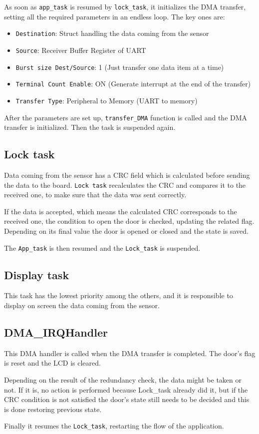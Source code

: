 As soon as \texttt{app\_task} is resumed by \texttt{lock\_task}, it initializes the DMA transfer, setting all the required parameters in an endless loop. The key ones are:
\begin{itemize}
    \item \texttt{Destination}: Struct handling the data coming from the sensor
    \item \texttt{Source}: Receiver Buffer Register of UART
    \item \texttt{Burst size Dest/Source}: 1 (Just transfer one data item at a time)
    \item \texttt{Terminal Count Enable}: ON (Generate interrupt at the end of the transfer)
    \item \texttt{Transfer Type}: Peripheral to Memory (UART to memory)
\end{itemize}
After the parameters are set up,  \texttt{transfer\_DMA} function is called and the DMA transfer is initialized. Then the task is suspended again. 


\subsection{Lock task}
Data coming from the sensor has a CRC field which is calculated before sending the data to the board. \texttt{Lock task} recalculates the CRC and compares it to the received one, to make sure that the data was sent correctly. 

If the data is accepted, which means the calculated CRC corresponds to the received one, the condition to open the door is checked, updating the related flag. Depending on its final value the door is opened or closed and the state is saved. 

The \texttt{App\_task} is then resumed and the \texttt{Lock\_task} is suspended. 

\subsection{Display task}
This task has the lowest priority among the others, and it is responsible to display on screen the data coming from the sensor. 


\subsection{DMA\_IRQHandler}
This DMA handler is called when the DMA transfer is completed. 
The door's flag is reset and the LCD is cleared.

Depending on the result of the redundancy check, the data might be taken or not. If it is, no action is performed because Lock\_task already did it, but if the CRC condition is not satisfied the door's state still needs to be decided and this is done restoring previous state.


Finally it resumes the \texttt{Lock\_task}, restarting the flow of the application. 
